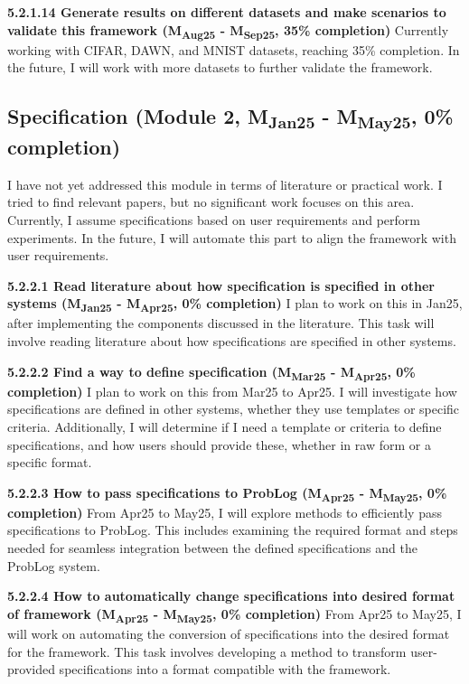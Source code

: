 \noindent \textbf{5.2.1.14 Generate results on different datasets and make scenarios to validate this framework (M\textsubscript{Aug25} - M\textsubscript{Sep25}, 35\% completion)} Currently working with CIFAR, DAWN, and MNIST datasets, reaching 35\% completion. In the future, I will work with more datasets to further validate the framework.


\subsection{Specification (Module 2, M\textsubscript{Jan25} - M\textsubscript{May25}, 0\% completion)} I have not yet addressed this module in terms of literature or practical work. I tried to find relevant papers, but no significant work focuses on this area. Currently, I assume specifications based on user requirements and perform experiments. In the future, I will automate this part to align the framework with user requirements.


\noindent \textbf{5.2.2.1 Read literature about how specification is specified in other systems (M\textsubscript{Jan25} - M\textsubscript{Apr25}, 0\% completion)} I plan to work on this in Jan25, after implementing the components discussed in the literature. This task will involve reading literature about how specifications are specified in other systems.

\noindent \textbf{5.2.2.2 Find a way to define specification (M\textsubscript{Mar25} - M\textsubscript{Apr25}, 0\% completion)} I plan to work on this from Mar25 to Apr25. I will investigate how specifications are defined in other systems, whether they use templates or specific criteria. Additionally, I will determine if I need a template or criteria to define specifications, and how users should provide these, whether in raw form or a specific format.

\noindent \textbf{5.2.2.3 How to pass specifications to ProbLog (M\textsubscript{Apr25} - M\textsubscript{May25}, 0\% completion)} From Apr25 to May25, I will explore methods to efficiently pass specifications to ProbLog. This includes examining the required format and steps needed for seamless integration between the defined specifications and the ProbLog system.

\noindent \textbf{5.2.2.4 How to automatically change specifications into desired format of framework (M\textsubscript{Apr25} - M\textsubscript{May25}, 0\% completion)} From Apr25 to May25, I will work on automating the conversion of specifications into the desired format for the framework. This task involves developing a method to transform user-provided specifications into a format compatible with the framework.



